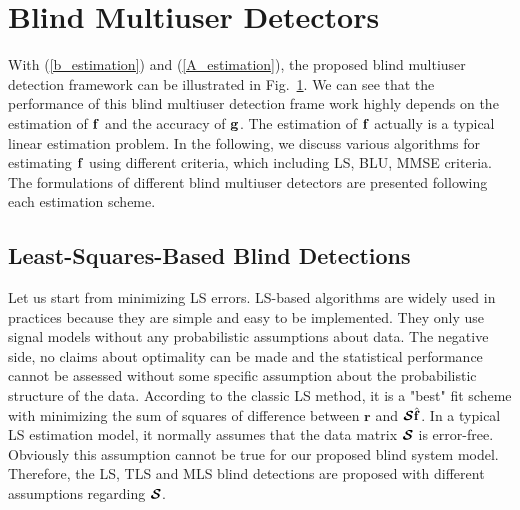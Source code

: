 \documentclass[a4paper,11pt,fleqn]{article}
\newcommand{\br}{{\mathbf r}}
\newcommand{\bg}{{\bf g}}
\newcommand{\bbf}{{\bf f}}
\newcommand{\bcS}{{\mbox {\boldmath ${\cal S}$}}}
\begin{document}
\pagebreak


\section{Blind Multiuser Detectors\label{LBD}}

With (\ref{b_estimation}) and (\ref{A_estimation}), the proposed
blind multiuser detection framework can be illustrated in
Fig.~\ref{MUDstruct}. We can see that the performance of this
blind multiuser detection frame work highly depends on the
estimation of $\bbf$ and the accuracy of $\bg$. The estimation of
$\bbf$ actually is a typical linear estimation problem. In the
following, we discuss various algorithms for estimating $\bbf$
using different criteria, which including LS, BLU, MMSE criteria.
The formulations of different blind multiuser detectors are
presented following each estimation scheme.

\begin{figure}
\label{MUDstruct}
\end{figure}


\subsection{Least-Squares-Based Blind Detections}
Let us start from minimizing LS errors. LS-based algorithms are
widely used in practices because they are simple and easy to be
implemented. They only use signal models without any probabilistic
assumptions about data. The negative side, no claims about
optimality can be made and the statistical performance cannot be
assessed without some specific assumption about the probabilistic
structure of the data. According to the classic LS method, it is a
"best" fit scheme with minimizing the sum of squares of difference
between $\br$ and $\bcS\hat{\bbf}$. In a typical LS estimation
model, it normally assumes that the data matrix $\bcS$ is
error-free. Obviously this assumption cannot be true for our
proposed blind system model. Therefore, the LS, TLS and MLS blind
detections are proposed with different assumptions regarding
$\bcS$.
\end{document}
